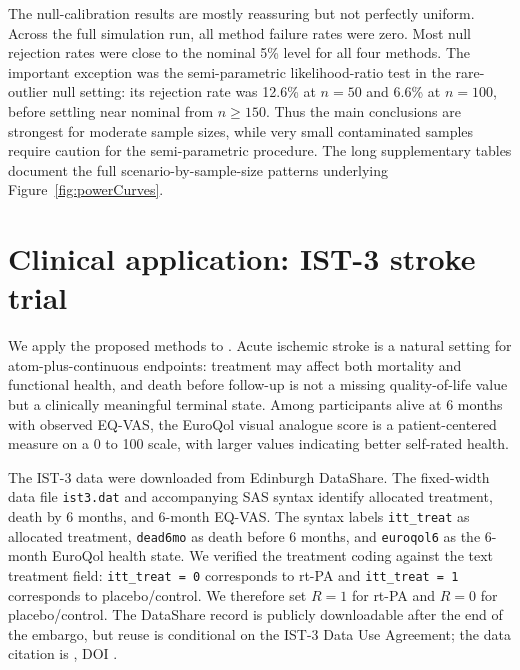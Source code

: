 \documentclass[11pt]{article}
\begin{document}
The null-calibration results are mostly reassuring but not perfectly uniform. Across the full simulation run, all method failure rates were zero. Most null rejection rates were close to the nominal 5\% level for all four methods. The important exception was the semi-parametric likelihood-ratio test in the rare-outlier null setting: its rejection rate was 12.6\% at $n=50$ and 6.6\% at $n=100$, before settling near nominal from $n \ge 150$. Thus the main conclusions are strongest for moderate sample sizes, while very small contaminated samples require caution for the semi-parametric procedure. The long supplementary tables document the full scenario-by-sample-size patterns underlying Figure~\ref{fig:powerCurves}.

\section{Clinical application: IST-3 stroke trial}\label{sec:application}

We apply the proposed methods to \ApplicationDatasetDescription{} \citep{IST3Lancet2012,IST3DataShare}. Acute ischemic stroke is a natural setting for atom-plus-continuous endpoints: treatment may affect both mortality and functional health, and death before follow-up is not a missing quality-of-life value but a clinically meaningful terminal state. Among participants alive at 6 months with observed EQ-VAS, the EuroQol visual analogue score is a patient-centered measure on a 0 to 100 scale, with larger values indicating better self-rated health.

The IST-3 data were downloaded from Edinburgh DataShare. The fixed-width data file \texttt{ist3.dat} and accompanying SAS syntax identify allocated treatment, death by 6 months, and 6-month EQ-VAS. The syntax labels \texttt{itt\_treat} as allocated treatment, \texttt{dead6mo} as death before 6 months, and \texttt{euroqol6} as the 6-month EuroQol health state. We verified the treatment coding against the text treatment field: \texttt{itt\_treat = 0} corresponds to rt-PA and \texttt{itt\_treat = 1} corresponds to placebo/control. We therefore set $R=1$ for rt-PA and $R=0$ for placebo/control. The DataShare record is publicly downloadable after the end of the embargo, but reuse is conditional on the IST-3 Data Use Agreement; the data citation is \citet{IST3DataShare}, DOI \ApplicationISTThreeDoi{}.
\end{document}
